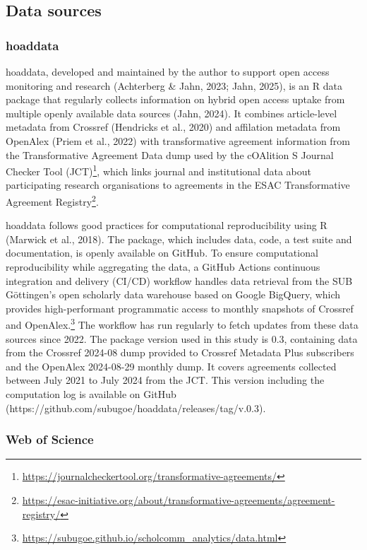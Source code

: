 \documentclass[a4paper,man,floatsintext,longtable,noextraspace,10pt]{apa6}
\begin{document}
\subsection{Data sources}\label{data-sources}

\subsubsection{hoaddata}\label{hoaddata}

hoaddata, developed and maintained by the author to support open access
monitoring and research (Achterberg \& Jahn, 2023; Jahn, 2025), is an R
data package that regularly collects information on hybrid open access
uptake from multiple openly available data sources (Jahn, 2024). It
combines article-level metadata from Crossref (Hendricks et al., 2020)
and affilation metadata from OpenAlex (Priem et al., 2022) with
transformative agreement information from the Transformative Agreement
Data dump used by the cOAlition S Journal Checker Tool (JCT)\footnote{\url{https://journalcheckertool.org/transformative-agreements/}},
which links journal and institutional data about participating research
organisations to agreements in the ESAC Transformative Agreement
Registry\footnote{\url{https://esac-initiative.org/about/transformative-agreements/agreement-registry/}}.

hoaddata follows good practices for computational reproducibility using
R (Marwick et al., 2018). The package, which includes data, code, a test
suite and documentation, is openly available on GitHub. To ensure
computational reproducibility while aggregating the data, a GitHub
Actions continuous integration and delivery (CI/CD) workflow handles
data retrieval from the SUB Göttingen's open scholarly data warehouse
based on Google BigQuery, which provides high-performant programmatic
access to monthly snapshots of Crossref and OpenAlex.\footnote{\url{https://subugoe.github.io/scholcomm_analytics/data.html}}
The workflow has run regularly to fetch updates from these data sources
since 2022. The package version used in this study is 0.3, containing
data from the Crossref 2024-08 dump provided to Crossref Metadata Plus
subscribers and the OpenAlex 2024-08-29 monthly dump. It covers
agreements collected between July 2021 to July 2024 from the JCT. This
version including the computation log is available on GitHub
(https://github.com/subugoe/hoaddata/releases/tag/v.0.3).

\subsubsection{Web of Science}\label{web-of-science}
\end{document}
